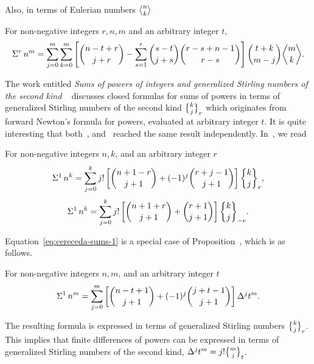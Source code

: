 Also, in terms of Eulerian numbers $\eulerian{n}{k}$
\begin{proposition}
  For non-negative integers $r,n,m$ and an arbitrary integer $t$,
  \begin{align*}
    \KnuthRFoldSum{r}{n}{m}
    = \sum_{j=0}^{m} \sum_{k=0}^{m}
    \left[ \binom{n-t+r}{j+r} -
      \sum_{s=1}^{r} \binom{s-t}{j+s} \binom{r-s+n-1}{r-s}
    \right]
    \binom{t+k}{m-j} \eulerian{m}{k}.
  \end{align*}
\end{proposition}
The work entitled
\textit{Sums of powers of integers and generalized Stirling numbers of the second kind}
~\cite{cereceda2022sumspowersintegersgeneralized} discusses closed formulas for sums of powers
in terms of generalized Stirling numbers of the second kind $\stirlingii{k}{j}_{r}$
which originates from forward Newton's formula for powers, evaluated at arbitrary
integer $t$.
It is quite interesting that both~\cite{cereceda2022sumspowersintegersgeneralized},
and~\cite{kolosov_2026_forward} reached the same result independently.
In~\cite{cereceda2022sumspowersintegersgeneralized}, we read
\begin{proposition}[Cereceda (2022)]
  For non-negative integers $n,k$, and an arbitrary integer $r$
  \begin{align}
    \label{eq:cereceda-sums-1}
    \KnuthRFoldSum{1}{n}{k} = \sum_{j=0}^{k} j!
    \left[
      \binom{n+1-r}{j+1} + (-1)^j \binom{r+j-1}{j+1}
    \right] \stirlingii{k}{j}_{r},
  \end{align}
  \begin{align}
    \label{eq:cereceda-sums-2}
    \KnuthRFoldSum{1}{n}{k} = \sum_{j=0}^{k} j!
    \left[
      \binom{n+1+r}{j+1} + \binom{r+1}{j+1}
    \right] \stirlingii{k}{j}_{-r}.
  \end{align}
\end{proposition}
Equation~\eqref{eq:cereceda-sums-1}
is a special case of Proposition~\cite[Proposition (1.9)]{kolosov_2026_forward},
which is as follows.
\begin{proposition}
  For non-negative integers $n,m$, and an arbitrary integer $t$
  \begin{align*}
    \Sigma^{1}\,{n}^{m} = \sum_{j=0}^{m}
    \left[ \binom{n-t+1}{j+1} + (-1)^j \binom{j+t-1}{j+1} \right] \Delta^{j} t^m.
  \end{align*}
\end{proposition}
The resulting formula is expressed in terms of generalized Stirling numbers $\stirlingii{k}{j}_{r}$.
This implies that finite differences of powers can be expressed
in terms of generalized Stirling numbers of the second kind,
$\Delta^{j} t^m = j! \stirlingii{m}{j}_{t}$.

